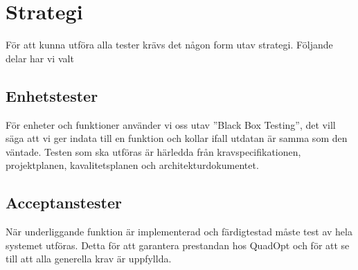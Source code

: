 \section{Strategi}
För att kunna utföra alla tester krävs det någon form utav strategi. Följande delar har vi valt

\subsection{Enhetstester}
För enheter och funktioner använder vi oss utav ''Black Box Testing'', det vill säga att vi ger indata till en funktion och kollar ifall utdatan är samma som den väntade. Testen som ska utföras är härledda från kravspecifikationen, projektplanen, kavalitetsplanen och architekturdokumentet.

\subsection{Acceptanstester}
När underliggande funktion är implementerad och färdigtestad måste test av hela systemet utföras. Detta för att garantera prestandan hos QuadOpt och för att se till att alla generella krav är uppfyllda.
